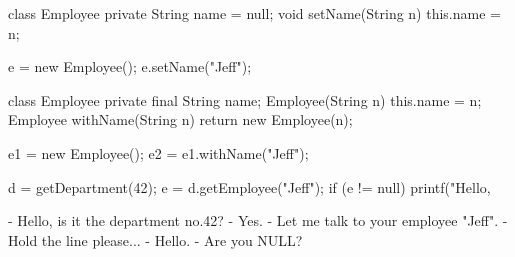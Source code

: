 \documentclass{article}
\begin{document}

\begin{lnSnippet}
class Employee {
  private String name = null;
  void setName(String n) {
    this.name = n;
  }
}

e = new Employee();
e.setName("Jeff");
\end{lnSnippet}
\begin{lnSnippet}
class Employee {
  private final String name;
  Employee(String n) {
    this.name = n;
  }
  Employee withName(String n) {
    return new Employee(n);
  }
}

e1 = new Employee();
e2 = e1.withName("Jeff");
\end{lnSnippet}


\begin{lnSnippet}
d = getDepartment(42);
e = d.getEmployee("Jeff");
if (e != null) {
  printf("Hello, %
}
\end{lnSnippet}
\begin{lnSnippet}
- Hello, is it the department no.42?
- Yes.
- Let me talk to your employee "Jeff".
- Hold the line please...
- Hello.
- Are you NULL?
\end{lnSnippet}


\end{document}
